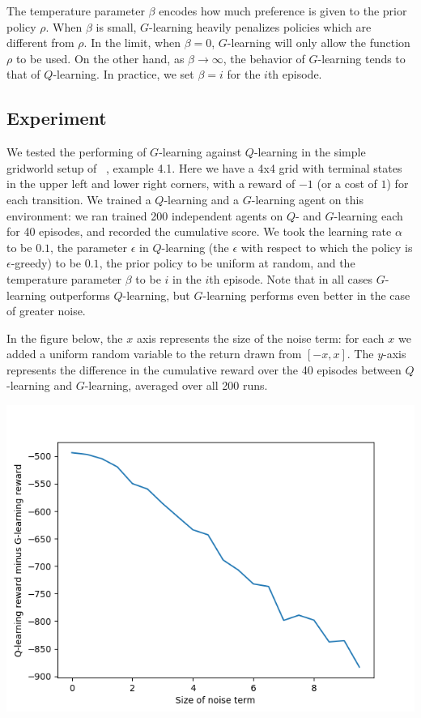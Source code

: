 \documentclass{article}
\begin{document}
The temperature parameter $\beta$ encodes how much preference is given to the prior policy $\rho$. When $\beta$ is small, $G$-learning heavily penalizes policies which are different from $\rho$. In the limit, when $\beta = 0$, $G$-learning will only allow the function $\rho$ to be used. On the other hand, as $\beta \to \infty$, the behavior of $G$-learning tends to that of $Q$-learning. In practice, we set $\beta = i$ for the $i$th episode.

\subsection{Experiment}

We tested the performing of $G$-learning against $Q$-learning in the simple gridworld setup of ~\cite{suttonAndBarto}, example 4.1. Here we have a 4x4 grid with terminal states in the upper left and lower right corners, with a reward of $-1$ (or a cost of $1$) for each transition. We trained a $Q$-learning and a $G$-learning agent on this environment: we ran trained 200 independent agents on $Q$- and $G$-learning each for 40 episodes, and recorded the cumulative score. We took the learning rate $\alpha$ to be $0.1$, the parameter $\epsilon$ in $Q$-learning (the $\epsilon$ with respect to which the policy is $\epsilon$-greedy) to be $0.1$, the prior policy to be uniform at random, and the temperature parameter $\beta$ to be $i$ in the $i$th episode. Note that in all cases $G$-learning outperforms $Q$-learning, but $G$-learning performs even better in the case of greater noise.

In the figure below, the $x$ axis represents the size of the noise term: for each $x$ we added a uniform random variable to the return drawn from $[-x,x]$. The $y$-axis represents the difference in the cumulative reward over the 40 episodes between $Q$-learning and $G$-learning, averaged over all 200 runs.

\includegraphics[]{noisevsreward.png}

 

\end{document}
